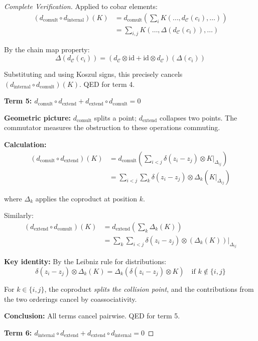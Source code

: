 \begin{proof}[Complete Verification]
Applied to cobar elements:
\begin{align*}
(d_{\text{comult}} \circ d_{\text{internal}})(K) &= d_{\text{comult}}\left(\sum_i 
K(\ldots, d_{\mathcal{C}}(c_i), \ldots)\right) \\
&= \sum_{i,j} K(\ldots, \Delta(d_{\mathcal{C}}(c_i)), \ldots)
\end{align*}

By the chain map property:
$$\Delta(d_{\mathcal{C}}(c_i)) = (d_{\mathcal{C}} \otimes \text{id} + \text{id} 
\otimes d_{\mathcal{C}})(\Delta(c_i))$$

Substituting and using Koszul signs, this precisely cancels $(d_{\text{internal}} 
\circ d_{\text{comult}})(K)$. QED for term 4.

\textbf{Term 5: $d_{\text{comult}} \circ d_{\text{extend}} + d_{\text{extend}} 
\circ d_{\text{comult}} = 0$}

\textbf{Geometric picture:} $d_{\text{comult}}$ splits a point; $d_{\text{extend}}$ 
collapses two points. The commutator measures the obstruction to these operations 
commuting.

\textbf{Calculation:}
\begin{align*}
(d_{\text{comult}} \circ d_{\text{extend}})(K) &= d_{\text{comult}}\left(\sum_{i<j} 
\delta(z_i - z_j) \otimes K|_{\Delta_{ij}}\right) \\
&= \sum_{i<j} \sum_k \delta(z_i - z_j) \otimes \Delta_k(K|_{\Delta_{ij}})
\end{align*}

where $\Delta_k$ applies the coproduct at position $k$.

Similarly:
\begin{align*}
(d_{\text{extend}} \circ d_{\text{comult}})(K) &= d_{\text{extend}}\left(\sum_k 
\Delta_k(K)\right) \\
&= \sum_k \sum_{i<j} \delta(z_i - z_j) \otimes (\Delta_k(K))|_{\Delta_{ij}}
\end{align*}

\textbf{Key identity:} By the Leibniz rule for distributions:
$$\delta(z_i - z_j) \otimes \Delta_k(K) = \Delta_k(\delta(z_i - z_j) \otimes K) 
\quad \text{if } k \notin \{i, j\}$$

For $k \in \{i,j\}$, the coproduct \emph{splits the collision point}, and the 
contributions from the two orderings cancel by coassociativity.

\textbf{Conclusion:} All terms cancel pairwise. QED for term 5.

\textbf{Term 6: $d_{\text{internal}} \circ d_{\text{extend}} + d_{\text{extend}} 
\circ d_{\text{internal}} = 0$}


\end{proof}
